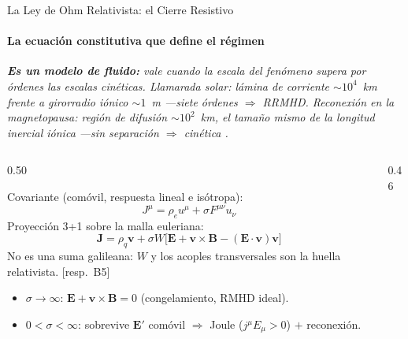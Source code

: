 \documentclass[aspectratio=169,9pt]{beamer}
\begin{document}
\begin{frame}{La Ley de Ohm Relativista: el Cierre Resistivo}
\framesubtitle{La ecuaci\'on constitutiva que define el r\'egimen}
{\scriptsize\color{INF3}\itshape \textbf{Es un modelo de fluido:} vale cuando la escala del
 fen\'omeno supera por \'ordenes las escalas cin\'eticas. Llamarada solar: l\'amina de
 corriente $\sim10^4$~km frente a girorradio i\'onico $\sim1$~m ---siete
 \'ordenes $\Rightarrow$ RRMHD. Reconexi\'on en la magnetopausa: regi\'on de difusi\'on
 $\sim10^2$~km, el tama\~no mismo de la longitud inercial i\'onica ---sin
 separaci\'on $\Rightarrow$ cin\'etica \citep{yamada-2010}.\par}
\vspace{0.10cm}
\begin{columns}[T]
\begin{column}{0.50\textwidth}
  \begin{tcolorbox}[EQ={Del marco com\'ovil al laboratorio}]
    \scriptsize
    Covariante (com\'ovil, respuesta lineal e is\'otropa):
    \[
      J^\mu=\rho_e u^\mu+\sigma F^{\mu\nu}u_\nu
    \]
    Proyecci\'on 3+1 sobre la malla euleriana:
    \[
      \boxed{\ \mathbf{J}=\rho_q\mathbf{v}
        +\sigma W\bigl[\mathbf{E}+\mathbf{v}\times\mathbf{B}
        -(\mathbf{E}\cdot\mathbf{v})\mathbf{v}\bigr]\ }
    \]
    {\tiny No es una suma galileana: $W$ y los acoples transversales son
    la huella relativista. \hfill[resp.\ B5]}
  \end{tcolorbox}
  \pause\vspace{0.1cm}
  \begin{tcolorbox}[RES={Los dos l\'imites f\'isicos}]
    \scriptsize
    \begin{itemize}\setlength\itemsep{2pt}
      \item $\sigma\to\infty$: $\mathbf E+\mathbf v\times\mathbf B=0$
            (congelamiento, RMHD ideal).
      \item $0<\sigma<\infty$: sobrevive $\mathbf E'$ com\'ovil
            $\Rightarrow$ Joule ($j^\mu E_\mu>0$) $+$ reconexi\'on.
    \end{itemize}
  \end{tcolorbox}
\end{column}
\begin{column}{0.46\textwidth}
  \pause
  \begin{tcolorbox}[WRN={El cierre y sus l\'imites de validez}]

\end{tcolorbox}
\end{column}
\end{columns}
\end{frame}
\end{document}
